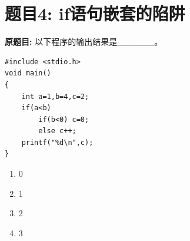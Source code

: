 \documentclass[a4paper,12pt]{article}
\begin{document}
\section*{题目4: if语句嵌套的陷阱}

\textbf{原题目:}
以下程序的输出结果是\_\_\_\_\_\_。
\begin{verbatim}
#include <stdio.h>
void main()
{
    int a=1,b=4,c=2;
    if(a<b)
        if(b<0) c=0;
        else c++;
    printf("%d\n",c);
}
\end{verbatim}
\begin{enumerate}
	\item[A)] 0
	\item[B)] 1
	\item[C)] 2
	\item[D)] 3
\end{enumerate}
\end{document}
